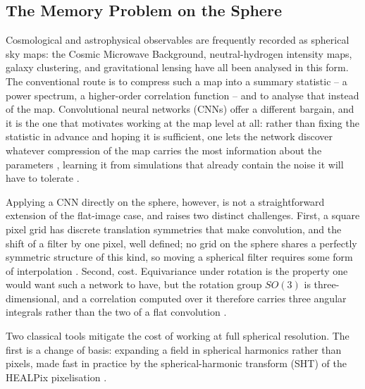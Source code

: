 \documentclass{report}
\begin{document}
\subsection{The Memory Problem on the Sphere}
\label{subsec:sr-problem}

Cosmological and astrophysical observables are frequently recorded as spherical sky maps: the Cosmic Microwave Background, neutral-hydrogen intensity maps, galaxy clustering, and gravitational lensing have all been analysed in this form. The conventional route is to compress such a map into a summary statistic -- a power spectrum, a higher-order correlation function \cite{gatti_dark_2024} -- and to analyse that instead of the map. Convolutional neural networks (CNNs) offer a different bargain, and it is the one that
motivates working at the map level at all: rather than fixing the statistic in advance and hoping it is sufficient, one lets the network discover whatever compression of the map carries the most information about the parameters \cite{jeffrey_dark_2024}, learning it from simulations that already contain the noise it will have to tolerate \cite{fluri_full_2022, perraudin_deepsphere_2019}.


Applying a CNN directly on the sphere, however, is not a straightforward extension of the flat-image case, and raises two distinct challenges. First, a square pixel grid has discrete translation symmetries that make convolution, and the shift of a filter by one pixel, well defined; no grid on the sphere shares a perfectly symmetric structure of this kind, so moving a spherical filter requires some form of interpolation \cite{cohen_spherical_2018}. Second, cost. Equivariance under rotation is the property one would want such a network to have, but the rotation group \mbox{$SO(3)$} is three-dimensional, and a correlation computed over it therefore carries three angular integrals rather than the two of a flat convolution \cite{cohen_spherical_2018}.

Two classical tools mitigate the cost of working at full spherical resolution. The first is a change of basis: expanding a field in spherical harmonics rather than pixels, made fast in practice by the spherical-harmonic transform (SHT) of the HEALPix pixelisation \cite{gorski_healpix_2005}.
\end{document}
